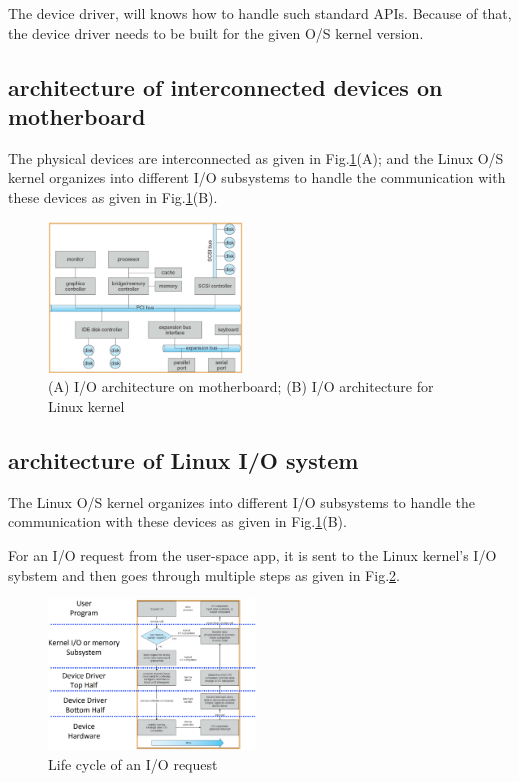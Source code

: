 The device driver, will knows how to handle such standard APIs. Because of
that, the device driver needs to be built for the given O/S kernel version.

\subsection{architecture of interconnected devices on motherboard}

The physical devices are interconnected as given in
Fig.\ref{fig:IO_architecture}(A); and the Linux O/S kernel organizes into
different I/O subsystems to handle the communication with these devices as given
in Fig.\ref{fig:IO_architecture}(B).

\begin{figure}[hbt]
  \centerline{\includegraphics[height=4cm,
  angle=0]{./images/IO_architecture.eps}}
  \caption{(A) I/O architecture on motherboard; (B) I/O architecture for Linux
  kernel}
  \label{fig:IO_architecture}
\end{figure}

\subsection{architecture of Linux I/O system}

The Linux O/S kernel organizes into different I/O subsystems to handle the
communication with these devices as given in Fig.\ref{fig:IO_architecture}(B).

For an I/O request from the user-space app, it is sent to the Linux kernel's I/O
sybstem and then goes through multiple steps as given in
Fig.\ref{fig:Life-cycle-IO-request}.

\begin{figure}[hbt]
  \centerline{\includegraphics[height=4cm,
  angle=0]{./images/Life-cycle-IO-request.eps}}
  \caption{Life cycle of an I/O request}
  \label{fig:Life-cycle-IO-request}
\end{figure}

